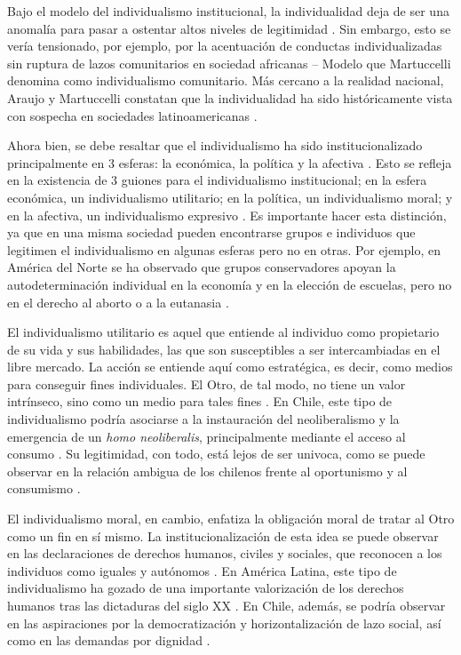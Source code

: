 \documentclass[12pt,twoside]{templates/facsothesis}
\begin{document}
Bajo el modelo del individualismo institucional, la individualidad deja de ser una anomalía para pasar a ostentar altos niveles de legitimidad \citep{martuccelli2018}. Sin embargo, esto se vería tensionado, por ejemplo, por la acentuación de conductas individualizadas sin ruptura de lazos comunitarios en sociedad africanas -- Modelo que Martuccelli \citeyearpar{martuccelli2018} denomina como individualismo comunitario. Más cercano a la realidad nacional, Araujo y Martuccelli constatan que la individualidad ha sido históricamente vista con sospecha en sociedades latinoamericanas \citep{araujo2020a}.

Ahora bien, se debe resaltar que el individualismo ha sido institucionalizado principalmente en 3 esferas: la económica, la política y la afectiva \citep{cortois2018, martuccelli2018}. Esto se refleja en la existencia de 3 guiones para el individualismo institucional; en la esfera económica, un individualismo utilitario; en la política, un individualismo moral; y en la afectiva, un individualismo expresivo \citep{cortois2018}. Es importante hacer esta distinción, ya que en una misma sociedad pueden encontrarse grupos e individuos que legitimen el individualismo en algunas esferas pero no en otras. Por ejemplo, en América del Norte se ha observado que grupos conservadores apoyan la autodeterminación individual en la economía y en la elección de escuelas, pero no en el derecho al aborto o a la eutanasia \citep{kemmelmeier2003}.

El individualismo utilitario es aquel que entiende al individuo como propietario de su vida y sus habilidades, las que son susceptibles a ser intercambiadas en el libre mercado. La acción se entiende aquí como estratégica, es decir, como medios para conseguir fines individuales. El Otro, de tal modo, no tiene un valor intrínseco, sino como un medio para tales fines \citep{cortois2018}. En Chile, este tipo de individualismo podría asociarse a la instauración del neoliberalismo y la emergencia de un \emph{homo neoliberalis}, principalmente mediante el acceso al consumo \citep{araujo2012, araujo2020a}. Su legitimidad, con todo, está lejos de ser univoca, como se puede observar en la relación ambigua de los chilenos frente al oportunismo \citep{araujo2014} y al consumismo \citep{araujo2012}.

El individualismo moral, en cambio, enfatiza la obligación moral de tratar al Otro como un fin en sí mismo. La institucionalización de esta idea se puede observar en las declaraciones de derechos humanos, civiles y sociales, que reconocen a los individuos como iguales y autónomos \citep{cortois2018}. En América Latina, este tipo de individualismo ha gozado de una importante valorización de los derechos humanos tras las dictaduras del siglo XX \citep{araujo2020a}. En Chile, además, se podría observar en las aspiraciones por la democratización y horizontalización de lazo social, así como en las demandas por dignidad \citep{araujo2012}.
\end{document}
